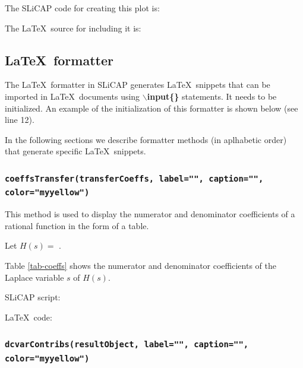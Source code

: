 \documentclass[a4paper,12pt]{article}
\begin{document}
The SLiCAP code for creating this plot is:



The \LaTeX$\,$ source for including it is:



\subsection{\LaTeX$\,$ formatter}\label{sec-fmtmethods}

The \LaTeX$\,$ formatter in SLiCAP generates \LaTeX$\,$ snippets that can be imported in \LaTeX$\,$ documents using {\textbf{$\backslash$input\{\}}} statements. It needs to be initialized. An example of the initialization of this formatter is shown below (see line 12).



In the following sections we describe formatter methods (in aplhabetic order) that generate specific \LaTeX$\,$ snippets.

\subsubsection{\texttt{coeffsTransfer(transferCoeffs, label="", caption="", \\ color="myyellow")}}

This method is used to display the numerator and denominator coefficients of a rational function in the form of a table.

Let $H(s)=$%
.

Table \ref{tab-coeffs} shows the numerator and denominator coefficients of the Laplace variable $s$ of $H(s)$.



SLiCAP script:



\LaTeX$\,$ code:



\subsubsection{\texttt{dcvarContribs(resultObject, label="", caption="", \\ color="myyellow")}}
\end{document}
